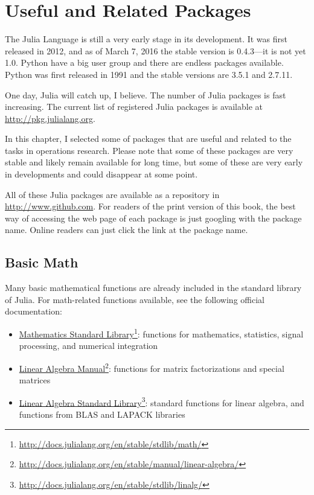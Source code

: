 \chapter{Useful and Related Packages}

The Julia Language is still a very early stage in its development. It was first released in 2012, and as of March 7, 2016 the stable version is 0.4.3---it is not yet 1.0. Python have a big user group and there are endless packages available. Python was first released in 1991 and the stable versions are 3.5.1 and 2.7.11.

One day, Julia will catch up, I believe. The number of Julia packages is fast increasing. The current list of registered Julia packages is available at \url{http://pkg.julialang.org}.

In this chapter, I selected some of packages that are useful and related to the tasks in operations research. Please note that some of these packages are very stable and likely remain available for long time, but some of these are very early in developments and could disappear at some point.

All of these Julia packages are available as a repository in \url{http://www.github.com}. For readers of the print version of this book, the best way of accessing the web page of each package is just googling with the package name. Online readers can just click the link at the package name.


\section{Basic Math}

Many basic mathematical functions are already included in the standard library of Julia. For math-related functions available, see the following official documentation:

\begin{itemize}
\item \href{http://docs.julialang.org/en/stable/stdlib/math/}{Mathematics Standard Library}\footnote{\url{http://docs.julialang.org/en/stable/stdlib/math/}}: functions for mathematics, statistics, signal processing, and numerical integration
\item \href{http://docs.julialang.org/en/stable/manual/linear-algebra/}{Linear Algebra Manual}\footnote{\url{http://docs.julialang.org/en/stable/manual/linear-algebra/}}: functions for matrix factorizations and special matrices
\item \href{http://docs.julialang.org/en/stable/stdlib/linalg/}{Linear Algebra Standard Library}\footnote{\url{http://docs.julialang.org/en/stable/stdlib/linalg/}}: standard functions for linear algebra, and functions from BLAS and LAPACK libraries
\end{itemize}

